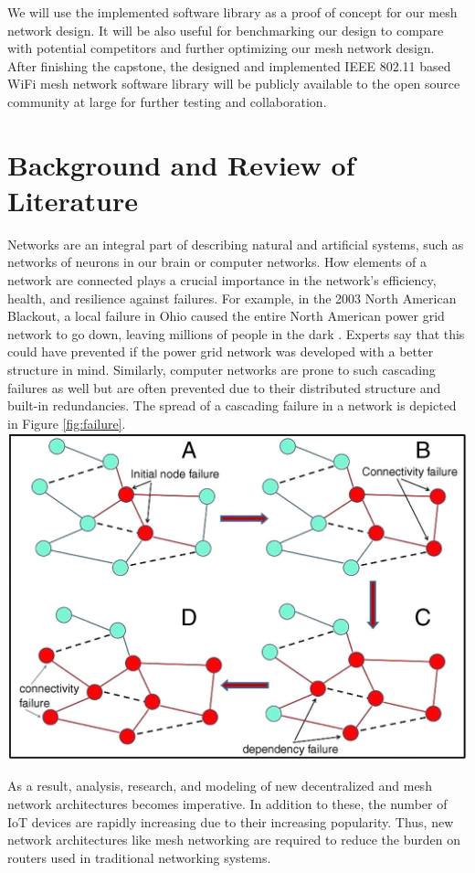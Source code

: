 \documentclass[conference]{IEEEtran}
\begin{document}
We will use the implemented software library as a proof of concept for our mesh network design. It will be also useful for benchmarking our design to compare with potential competitors and further optimizing our mesh network design. After finishing the capstone, the designed and implemented IEEE 802.11 based WiFi mesh network software library will be publicly available to the open source community at large for further testing and collaboration.

\section{Background and Review of Literature}
Networks are an integral part of describing natural and artificial systems, such as networks of neurons in our brain or computer networks. How elements of a network are connected plays a crucial importance in the network's efficiency, health, and resilience against failures. For example, in the 2003 North American Blackout, a local failure in Ohio caused the entire North American power grid network to go down, leaving millions of people in the dark \cite[]{blackout}. Experts say that this could have prevented if the power grid network was developed with a better structure in mind. Similarly, computer networks are prone to such cascading failures as well but are often prevented due to their distributed structure and built-in redundancies. The spread of a cascading failure in a network is depicted in Figure \ref{fig:failure}. \\

\begingroup
    \centering
    \medskip
    \includegraphics[width=0.4\columnwidth]{images/failure.jpg}
    \label{fig:failure}
    \medskip
\endgroup

\noindent As a result, analysis, research, and modeling of new decentralized and mesh network architectures becomes imperative. In addition to these, the number of IoT devices are rapidly increasing due to their increasing popularity. Thus, new network architectures like mesh networking are required to reduce the burden on routers used in traditional networking systems.\\
\end{document}
